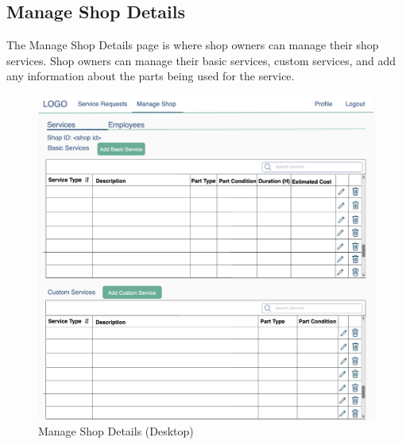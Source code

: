 \documentclass[12pt, titlepage]{article}
\begin{document}
\subsection{Manage Shop Details}
The Manage Shop Details page is where shop owners can manage their shop services. Shop owners can
manage their basic services, custom services, and add any information about the parts being used
for the service.

\begin{figure}[H]
	\centering
	\includegraphics[width=\textwidth]{mockups/Manage Shop (Shop Settings) (Desktop).png}
	\caption{Manage Shop \textemdash{} Details (Desktop)}
\end{figure}
\end{document}
